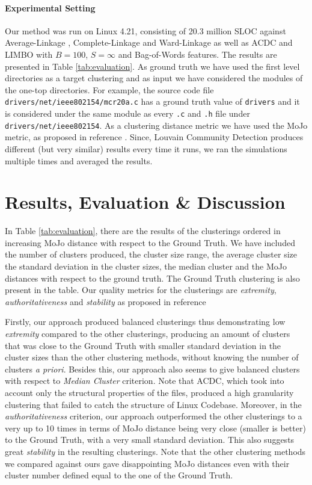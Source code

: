 \documentclass[sigconf,review, anonymous]{acmart}
\begin{document}
\paragraph{Experimental Setting} Our method was run on Linux 4.21,
consisting of 20.3 million SLOC against Average-Linkage \cite{average}, Complete-Linkage \cite{complete} 
and Ward-Linkage \cite{ward} as well as ACDC and LIMBO with $B = 100$, $S = \infty$ and Bag-of-Words features. The results are presented in Table \ref{tab:evaluation}. 
As ground truth we have used the first level directories as a target clustering and as input we have considered 
the modules of the one-top directories. 
For example, the source code file \texttt{drivers/net/ieee802154\-/mcr20a.c} has a ground truth value of \texttt{drivers} 
and it is considered under the same module as every \texttt{.c} and \texttt{.h} file under \texttt{drivers/net/ieee802154}. 
As a clustering distance metric we have used the MoJo metric, as proposed in reference \cite{mojo}. 
Since, Louvain Community Detection produces  different (but very similar) results every time it runs, we ran the simulations 
multiple times and averaged the results. 

\section{Results, Evaluation \& Discussion}

In Table \ref{tab:evaluation}, there are the results of the clusterings ordered in increasing MoJo distance 
with respect to the Ground Truth. 
We have included the number of clusters produced, the cluster size range, the average cluster size the standard
deviation in the cluster sizes, the median cluster and the MoJo distances with respect to the ground truth. 
The Ground Truth clustering is also present in the table. 
Our quality metrics for the clusterings are 
\emph{extremity}, \emph{authoritativeness} and \emph{stability} as proposed in reference \cite{evaluation}

Firstly, our approach produced balanced clusterings thus demonstrating low \emph{extremity} compared to the other clusterings, 
producing an amount of clusters that was close to the Ground Truth with smaller standard deviation in the cluster sizes than 
the other clustering methods, without knowing the number of clusters \emph{a priori}. 
Besides this, our approach also seems to give balanced clusters with respect to \emph{Median Cluster} criterion. 
Note that ACDC, which took into account only the structural properties of the files, produced a high 
granularity clustering that failed to catch the structure of Linux Codebase. 
Moreover, in the \emph{authoritativeness} criterion, our approach outperformed the other clusterings to a very up to 10 times 
in terms of MoJo distance being very close (smaller is better) to the Ground Truth, with a very small standard deviation. 
This also suggests great \emph{stability} in the resulting clusterings. 
Note that the other clustering methods we compared against ours gave disappointing MoJo distances even with their cluster
number defined equal to the one of the Ground Truth. 
\end{document}
